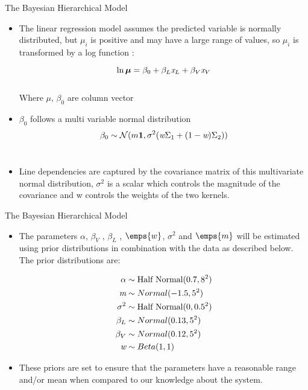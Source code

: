 \documentclass{beamer}
\begin{document}
\begin{frame}{The Bayesian Hierarchical Model}
\begin{block}{}
\begin{itemize}
    \item The linear regression model assumes the predicted variable is normally distributed, but $\mu_i$
is positive and may have a large range of values, so $\mu_i$ is
transformed by a log function :

\begin{equation}
    \ln\boldsymbol{\mu} = \beta_0+\beta_L\emph{x}_L + \beta_V\emph{x}_V
\end{equation}\\

Where $\mu$, $\beta_0$ are column vector
\item $\beta_0$ follows a multi variable normal distribution
\begin{equation}
    \beta_0 \sim \mathcal{N}(m\boldsymbol{1},\sigma^2(\emph{w}\Sigma_1 + (1-\emph{w})\Sigma_2))
\end{equation}\\
\item Line dependencies are captured by the covariance matrix of this
multivariate normal distribution, $\sigma^2$ is a scalar which controls
the magnitude of the covariance and w controls the weights of
the two kernels.
\end{itemize}
\end{block}
\end{frame}


\begin{frame}{The Bayesian Hierarchical Model}
\begin{block}{}
\begin{itemize}
    \item The parameters $\alpha$, $\beta_V$ , $\beta_L$ , $\emps{w}$, $\sigma^2$ and $\emps{m}$ will be
estimated using prior distributions in combination with the data
as described below.
The prior distributions are:


\begin{equation}
\begin{split}
\alpha &\sim \text{Half Normal}(0.7,8^2) \\
\emph{m} &\sim Normal(-1.5,5^2)\\
\sigma^2 &\sim \text{Half Normal}(0,0.5^2)\\
\beta_L &\sim Normal(0.13,5^2)\\
\beta_V &\sim Normal(0.12,5^2)\\
\emph{w} &\sim Beta(1,1)
\end{split}   
\end{equation}

\item These priors are set to ensure that the parameters have a reasonable range and/or mean when compared to our knowledge
about the system.
\end{itemize}
\end{block}
\end{frame}
\end{document}
